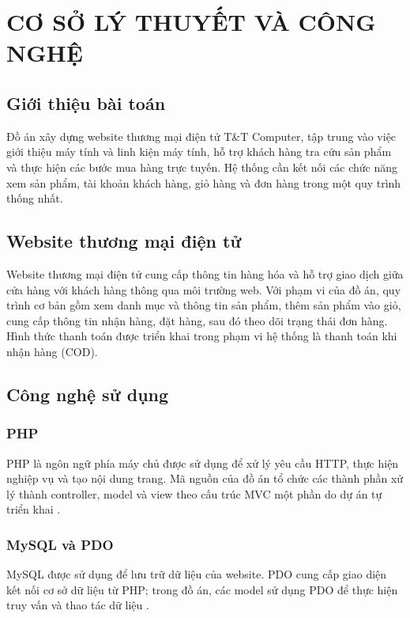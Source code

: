 \chapter{CƠ SỞ LÝ THUYẾT VÀ CÔNG NGHỆ}\label{chap1_intro}
\vspace{-40pt}
\renewcommand{\thesection}{\thechapter.\arabic{section}}
\setcounter{section}{0} %

\section{Giới thiệu bài toán}
Đồ án xây dựng website thương mại điện tử T\&T Computer, tập trung vào việc giới thiệu máy tính và linh kiện máy tính, hỗ trợ khách hàng tra cứu sản phẩm và thực hiện các bước mua hàng trực tuyến. Hệ thống cần kết nối các chức năng xem sản phẩm, tài khoản khách hàng, giỏ hàng và đơn hàng trong một quy trình thống nhất.

\section{Website thương mại điện tử}
Website thương mại điện tử cung cấp thông tin hàng hóa và hỗ trợ giao dịch giữa cửa hàng với khách hàng thông qua môi trường web. Với phạm vi của đồ án, quy trình cơ bản gồm xem danh mục và thông tin sản phẩm, thêm sản phẩm vào giỏ, cung cấp thông tin nhận hàng, đặt hàng, sau đó theo dõi trạng thái đơn hàng. Hình thức thanh toán được triển khai trong phạm vi hệ thống là thanh toán khi nhận hàng (COD).

\section{Công nghệ sử dụng}
\subsection{PHP}
PHP là ngôn ngữ phía máy chủ được sử dụng để xử lý yêu cầu HTTP, thực hiện nghiệp vụ và tạo nội dung trang. Mã nguồn của đồ án tổ chức các thành phần xử lý thành controller, model và view theo cấu trúc MVC một phần do dự án tự triển khai \cite{phpmanual}.

\subsection{MySQL và PDO}
MySQL được sử dụng để lưu trữ dữ liệu của website. PDO cung cấp giao diện kết nối cơ sở dữ liệu từ PHP; trong đồ án, các model sử dụng PDO để thực hiện truy vấn và thao tác dữ liệu \cite{mysqlmanual,pdomanual}.

